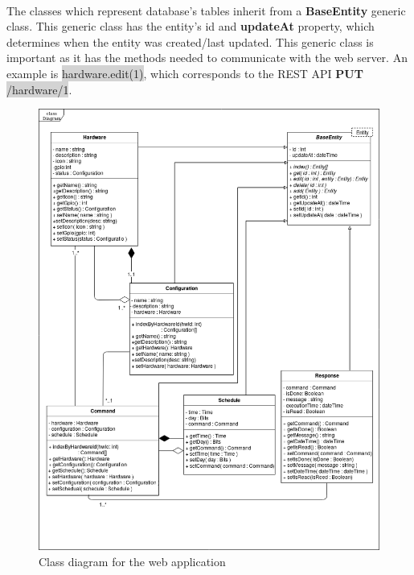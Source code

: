 \documentclass[12pt, oneside, a4paper]{book}
\newcommand{\code}[1]{{\color{red}\colorbox{lightgray}{#1}}}
\begin{document}
					\paragraph{}The classes which represent database's tables inherit from a \textbf{BaseEntity} generic class. This generic class has the entity's id and \textbf{updateAt} property, which determines when the entity was created/last updated. This generic class is important as it has the methods needed to communicate with the web server. An example is \code{hardware.edit(1)}, which corresponds to the REST API \textbf{PUT} \code{/hardware/1}.
					\begin{figure}[H]
						\caption{Class diagram for the web application}
						\label{fig:class_web}
						\includegraphics[width=\linewidth]{img/diagram_class1.png}
					\end{figure}
\end{document}
